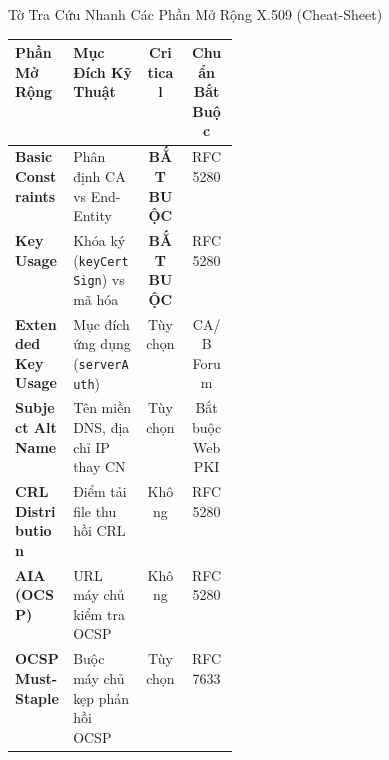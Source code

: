 \begin{frame}{Tờ Tra Cứu Nhanh Các Phần Mở Rộng X.509 (Cheat-Sheet) \selfstudy}
  \begin{table}[h]
    \centering\scriptsize
    \begin{tabularx}{\linewidth}{@{}p{0.26\linewidth} X c c@{}}
      \toprule
      \textbf{Phần Mở Rộng} & \textbf{Mục Đích Kỹ Thuật} & \textbf{Critical} & \textbf{Chuẩn Bắt Buộc} \\
      \midrule
      \textbf{Basic Constraints} & Phân định CA vs End-Entity & \textbf{BẮT BUỘC} & RFC 5280 \\
      \textbf{Key Usage} & Khóa ký (\texttt{keyCertSign}) vs mã hóa & \textbf{BẮT BUỘC} & RFC 5280 \\
      \textbf{Extended Key Usage} & Mục đích ứng dụng (\texttt{serverAuth}) & Tùy chọn & CA/B Forum \\
      \textbf{Subject Alt Name} & Tên miền DNS, địa chỉ IP thay CN & Tùy chọn & Bắt buộc Web PKI \\
      \textbf{CRL Distribution} & Điểm tải file thu hồi CRL & Không & RFC 5280 \\
      \textbf{AIA (OCSP)} & URL máy chủ kiểm tra OCSP & Không & RFC 5280 \\
      \textbf{OCSP Must-Staple} & Buộc máy chủ kẹp phản hồi OCSP & Tùy chọn & RFC 7633 \\
      \bottomrule
    \end{tabularx}
  \end{table}
\end{frame}


